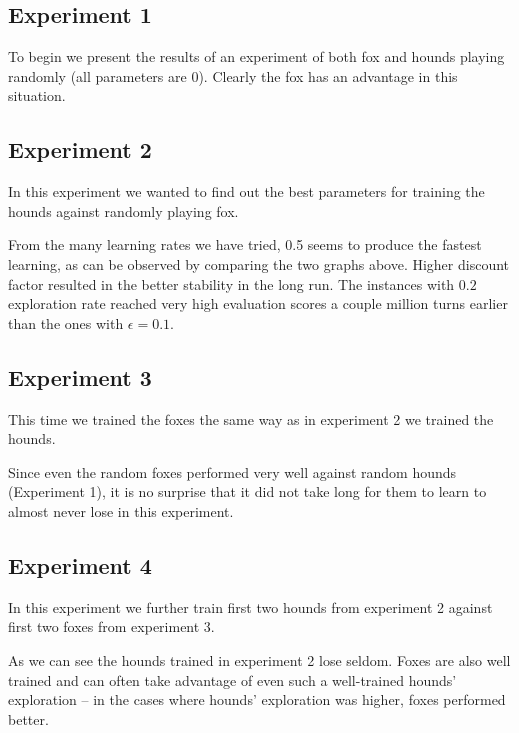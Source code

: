 \documentclass[a4paper]{article}
\begin{document}
\subsection{Experiment 1}
To begin we present the results of an experiment of both fox and hounds playing
randomly (all parameters are 0). Clearly the fox has an advantage in this
situation.



\subsection{Experiment 2}
In this experiment we wanted to find out the best parameters for training the
hounds against randomly playing fox.





From the many learning rates we have tried, 0.5 seems to produce the fastest
learning, as can be observed by comparing the two graphs above. Higher
discount factor resulted in the better stability in the long run. The
instances with $0.2$ exploration rate reached very high evaluation scores
a couple million turns earlier than the ones with $\epsilon = 0.1$.

\subsection{Experiment 3}
This time we trained the foxes the same way as in experiment 2 we trained the
hounds.





Since even the random foxes performed very well against random hounds
(Experiment 1), it is no surprise that it did not take long for them to learn
to almost never lose in this experiment.

\subsection{Experiment 4}
In this experiment we further train first two hounds from experiment 2 against
first two foxes from experiment 3.









As we can see the hounds trained in experiment 2 lose seldom. Foxes are also
well trained and can often take advantage of even such a well-trained hounds'
exploration -- in the cases where hounds' exploration was higher, foxes
performed better.
\end{document}
